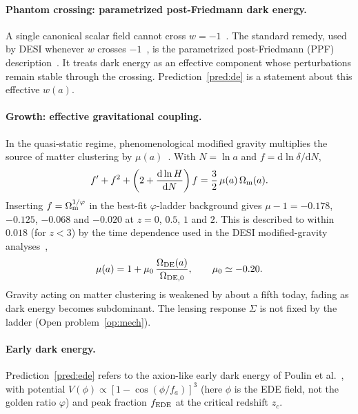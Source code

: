 \documentclass[11pt]{article}
\theoremstyle{definition}
\theoremstyle{remark}
\newcommand{\gr}{\varphi}
\newcommand{\Om}{\Omega_{\rm m}}
\newcommand{\fede}{f_{\rm EDE}}
\begin{document}
\paragraph{Phantom crossing: parametrized post-Friedmann dark energy.} A single canonical scalar field cannot cross $w = -1$~\cite{Vikman}. The standard remedy, used by DESI whenever $w$ crosses $-1$~\cite{DESI-DR2}, is the parametrized post-Friedmann (PPF) description~\cite{FangHuLewis}. It treats dark energy as an effective component whose perturbations remain stable through the crossing. Prediction~\ref{pred:de} is a statement about this effective $w(a)$.

\paragraph{Growth: effective gravitational coupling.} In the quasi-static regime, phenomenological modified gravity multiplies the source of matter clustering by $\mu(a)$~\cite{AKS}. With $N = \ln a$ and $f = \mathrm d\ln\delta/\mathrm dN$,
\begin{equation}
f' + f^2 + \left(2 + \frac{\mathrm d\ln H}{\mathrm dN}\right) f = \frac32\,\mu(a)\,\Om(a).
\label{eq:mu}
\end{equation}
Inserting $f = \Om^{1/\gr}$ in the best-fit $\gr$-ladder background gives $\mu - 1 = -0.178$, $-0.125$, $-0.068$ and $-0.020$ at $z = 0$, $0.5$, $1$ and $2$. This is described to within $0.018$ (for $z < 3$) by the time dependence used in the DESI modified-gravity analyses~\cite{Ishak},
\begin{equation}
\mu(a) = 1 + \mu_0\,\frac{\Omega_{\rm DE}(a)}{\Omega_{\rm DE,0}}, \qquad \mu_0 \simeq -0.20 .
\end{equation}
Gravity acting on matter clustering is weakened by about a fifth today, fading as dark energy becomes subdominant. The lensing response $\Sigma$ is not fixed by the ladder (Open problem~\ref{op:mech}).

\paragraph{Early dark energy.} Prediction~\ref{pred:ede} refers to the axion-like early dark energy of Poulin et al.~\cite{Poulin}, with potential $V(\phi) \propto [1 - \cos(\phi/f_a)]^3$ (here $\phi$ is the EDE field, not the golden ratio $\gr$) and peak fraction $\fede$ at the critical redshift $z_c$.

\end{document}
